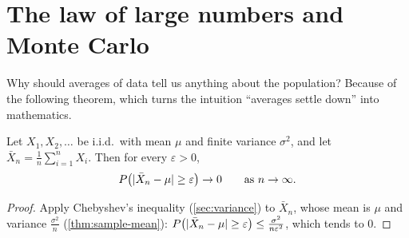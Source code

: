 \section{The law of large numbers and Monte Carlo}\label{sec:lln}

Why should averages of data tell us anything about the population? Because of
the following theorem, which turns the intuition ``averages settle down'' into
mathematics.

\begin{theorem}\label{thm:lln}
Let $X_1, X_2, \dots$ be i.i.d.\ with mean $\mu$ and finite variance $\sigma^2$,
and let $\bar X_n = \frac1n\sum_{i=1}^nX_i$. Then for every $\varepsilon > 0$,
\[
  P\bigl(\lvert\bar X_n - \mu\rvert \ge \varepsilon\bigr) \to 0
  \qquad\text{as } n \to \infty .
\]
\end{theorem}

\begin{proof}
Apply Chebyshev's inequality (\cref{sec:variance}) to $\bar X_n$, whose mean is
$\mu$ and variance $\frac{\sigma^2}{n}$ (\cref{thm:sample-mean}):
$P\bigl(\lvert\bar X_n - \mu\rvert \ge \varepsilon\bigr) \le \frac{\sigma^2}{n\varepsilon^2}$,
which tends to $0$.
\end{proof}

